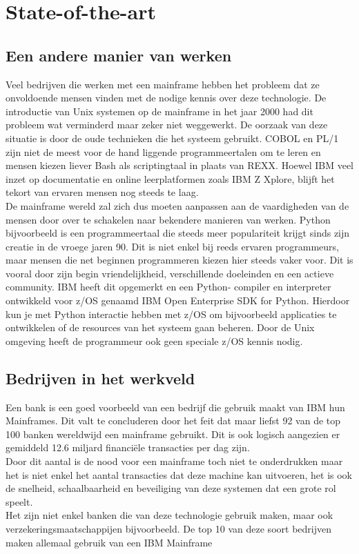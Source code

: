 
\section{State-of-the-art}%
\label{sec:state-of-the-art}

\subsection{Een andere manier van werken}
Veel bedrijven die werken met een mainframe hebben het probleem dat ze onvoldoende mensen vinden met de nodige kennis over deze technologie. De introductie van Unix systemen op de mainframe in het jaar 2000 \autocite{Mertic2020} had dit probleem wat verminderd maar zeker niet weggewerkt. De oorzaak van deze situatie is door de oude technieken die het systeem gebruikt. COBOL en PL/1 zijn niet de meest voor de hand liggende programmeertalen om te leren en mensen kiezen liever Bash als scriptingtaal in plaats van REXX. Hoewel IBM veel inzet op documentatie en online leerplatformen zoals IBM Z Xplore, blijft het tekort van ervaren mensen nog steeds te laag. \\

De mainframe wereld zal zich dus moeten aanpassen aan de vaardigheden van de mensen door over te schakelen naar bekendere manieren van werken. 
Python bijvoorbeeld is een programmeertaal die steeds meer populariteit krijgt sinds zijn creatie in de vroege jaren 90. Dit is niet enkel bij reeds ervaren programmeurs, maar mensen die net beginnen programmeren kiezen hier steeds vaker voor. Dit is vooral door zijn begin vriendelijkheid, verschillende doeleinden en een actieve community. \autocite{Johnson2023}
IBM heeft dit opgemerkt en een Python- compiler en interpreter ontwikkeld voor z/OS genaamd IBM Open Enterprise SDK for Python. Hierdoor kun je met Python interactie hebben met z/OS om bijvoorbeeld applicaties te ontwikkelen of de resources van het systeem gaan beheren. Door de Unix omgeving heeft de programmeur ook geen speciale z/OS kennis nodig. \autocite{Klaey2023}

\subsection{Bedrijven in het werkveld}
Een bank is een goed voorbeeld van een bedrijf die gebruik maakt van IBM hun Mainframes. Dit valt te concluderen door het feit dat maar liefst 92 van de top 100 banken wereldwijd een mainframe gebruikt. Dit is ook logisch aangezien er gemiddeld 12.6 miljard financiële transacties per dag zijn. \autocite{Wagle2017} \\
Door dit aantal is de nood voor een mainframe toch niet te onderdrukken maar het is niet enkel het aantal transacties dat deze machine kan uitvoeren, het is ook de snelheid, schaalbaarheid en beveiliging van deze systemen dat een grote rol speelt. \\
Het zijn niet enkel banken die van deze technologie gebruik maken, maar ook  verzekeringsmaatschappijen bijvoorbeeld. De top 10 van deze soort bedrijven maken allemaal gebruik van een IBM Mainframe \autocite{Tozzi2022}

